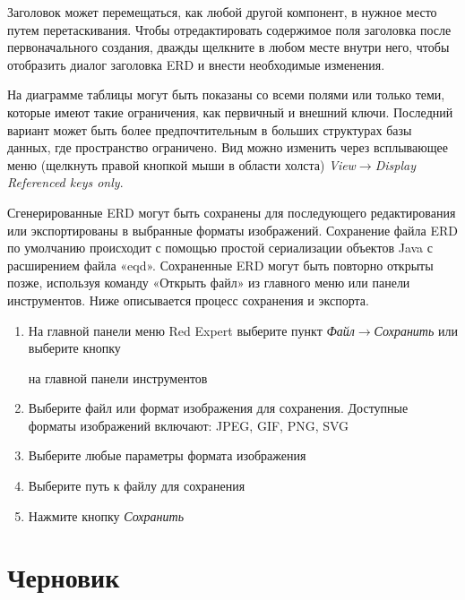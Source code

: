 Заголовок может перемещаться, как любой другой компонент, в нужное место путем перетаскивания. Чтобы отредактировать содержимое поля заголовка после первоначального создания, дважды щелкните в любом месте внутри него, чтобы отобразить диалог заголовка ERD и внести необходимые изменения.


На диаграмме таблицы могут быть показаны со всеми полями или только теми, которые имеют такие ограничения, как первичный и внешний ключи. Последний вариант может быть более предпочтительным в больших структурах базы данных, где пространство ограничено. Вид можно изменить через всплывающее меню (щелкнуть правой кнопкой мыши в области холста) \textit{View}$\rightarrow$\textit{Display Referenced keys only}.


Сгенерированные ERD могут быть сохранены для последующего редактирования или экспортированы в выбранные форматы изображений. Сохранение файла ERD по умолчанию происходит с помощью простой сериализации объектов Java с расширением файла «eqd». Сохраненные ERD могут быть повторно открыты позже, используя команду «Открыть файл» из главного меню или панели инструментов.
Ниже описывается процесс сохранения и экспорта.

\begin{enumerate}
	\item На главной панели меню Red Expert выберите пункт \textit{Файл}$\rightarrow$\textit{Сохранить} или выберите кнопку
	на главной панели инструментов
	\item Выберите файл или формат изображения для сохранения. Доступные форматы изображений включают: JPEG, GIF, PNG, SVG
	\item Выберите любые параметры формата изображения
	\item Выберите путь к файлу для сохранения
	\item Нажмите кнопку \textit{Сохранить}
\end{enumerate}

\newpage

\section{Черновик}\label{sec:draft}

